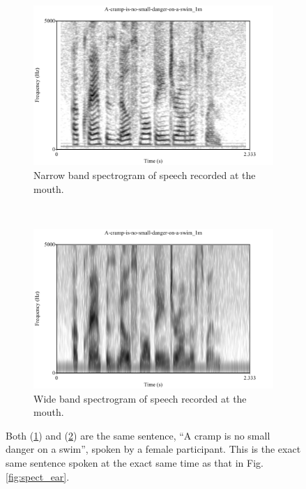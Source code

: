 \begin{figure}[H]
\centering
\begin{subfigure}{\textwidth}
  \centering
  \includegraphics[width=0.75\linewidth]{figure/spctgrmNarrowMouth_35.pdf}
  \caption{Narrow band spectrogram of speech recorded at the mouth.}
  \label{spctgrmNarrowMouth_35}
\end{subfigure}%
\\[2ex]
\begin{subfigure}{\textwidth}
  \centering
  \includegraphics[width=0.75\linewidth]{figure/spctgrmWideMouth_35.pdf}
  \caption{Wide band spectrogram of speech recorded at the mouth.}
  \label{spctgrmWideMouth_35}
\end{subfigure}
\caption{Both (\ref{spctgrmNarrowMouth_35}) and (\ref{spctgrmWideMouth_35}) are the same sentence, ``A cramp is no small danger on a swim'', spoken by a female participant. This is the exact same sentence spoken at the exact same time as that in Fig. \ref{fig:spect_ear}.}
\label{fig:spect_mouth}
\end{figure}

